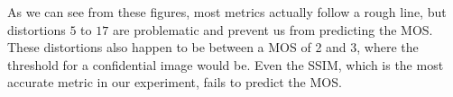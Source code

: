 \documentclass{article}
\begin{document}


As we can see from these figures, most metrics actually follow a rough line, but distortions $5$ to $17$ are problematic and prevent us from predicting the MOS. These distortions also happen to be between a MOS of 2 and 3, where the threshold for a confidential image would be. Even the SSIM, which is the most accurate metric in our experiment, fails to predict the MOS.%
\end{document}
